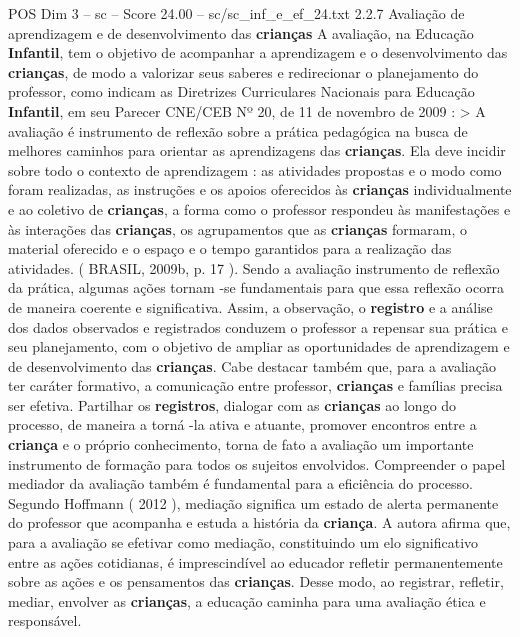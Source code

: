 \begin{textsample}{POS Dim 3 – sc – Score 24.00 – sc/sc\_inf\_e\_ef\_24.txt}  \label{ex:f3_pos_062}
2.2.7 Avaliação de aprendizagem e de desenvolvimento das \textbf{crianças} A avaliação, na Educação \textbf{Infantil}, tem o objetivo de acompanhar a aprendizagem e o desenvolvimento das \textbf{crianças}, de modo a valorizar seus saberes e redirecionar o planejamento do professor, como indicam as Diretrizes Curriculares Nacionais para Educação \textbf{Infantil}, em seu Parecer CNE/CEB Nº 20, de 11 de novembro de 2009 : > A avaliação é instrumento de reflexão sobre a prática pedagógica na busca de melhores caminhos para orientar as aprendizagens das \textbf{crianças}.
Ela deve incidir sobre todo o contexto de aprendizagem : as atividades propostas e o modo como foram realizadas, as instruções e os apoios oferecidos às \textbf{crianças} individualmente e ao coletivo de \textbf{crianças}, a forma como o professor respondeu às manifestações e às interações das \textbf{crianças}, os agrupamentos que as \textbf{crianças} formaram, o material oferecido e o espaço e o tempo garantidos para a realização das atividades. ( BRASIL, 2009b, p. 17 ).
Sendo a avaliação instrumento de reflexão da prática, algumas ações tornam -se fundamentais para que essa reflexão ocorra de maneira coerente e significativa.
Assim, a observação, o \textbf{registro} e a análise dos dados observados e registrados conduzem o professor a repensar sua prática e seu planejamento, com o objetivo de ampliar as oportunidades de aprendizagem e de desenvolvimento das \textbf{crianças}.
Cabe destacar também que, para a avaliação ter caráter formativo, a comunicação entre professor, \textbf{crianças} e famílias precisa ser efetiva.
Partilhar os \textbf{registros}, dialogar com as \textbf{crianças} ao longo do processo, de maneira a torná -la ativa e atuante, promover encontros entre a \textbf{criança} e o próprio conhecimento, torna de fato a avaliação um importante instrumento de formação para todos os sujeitos envolvidos.
Compreender o papel mediador da avaliação também é fundamental para a eficiência do processo.
Segundo Hoffmann ( 2012 ), mediação significa um estado de alerta permanente do professor que acompanha e estuda a história da \textbf{criança}.
A autora afirma que, para a avaliação se efetivar como mediação, constituindo um elo significativo entre as ações cotidianas, é imprescindível ao educador refletir permanentemente sobre as ações e os pensamentos das \textbf{crianças}.
Desse modo, ao registrar, refletir, mediar, envolver as \textbf{crianças}, a educação caminha para uma avaliação ética e responsável.

\end{textsample}
